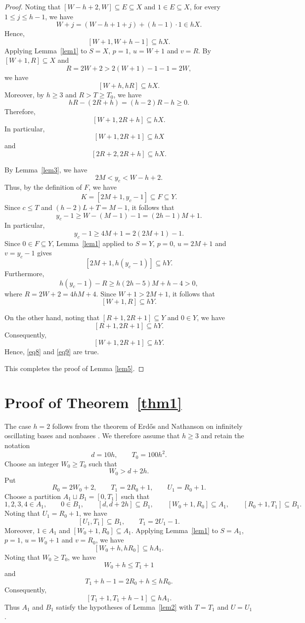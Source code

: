 \documentclass[reqno,12pt,twoside]{article}
\numberwithin{equation}{section}
\begin{document}
\begin{proof}
Noting that $[W-h+2,W]\subseteq E\subseteq X$ and $1\in E\subseteq X$,
for every $1\le j\le h-1$, we have
\[
 W+j=(W-h+1+j)+(h-1)\cdot1\in hX.
\]
Hence,
\[
 [W+1,W+h-1]\subseteq hX.
\]
Applying Lemma~\ref{lem1} to $S=X$, $p=1$,
$u=W+1$ and $v=R$. By $[W+1,R]\subseteq X$ and \[
 R=2W+2>2(W+1)-1-1=2W,
\]
we have
\[
 [W+h,hR]\subseteq hX.
\]
Moreover, by $h\ge3$ and $R>T\ge T_0$, we have
\[
 hR-(2R+h)=(h-2)R-h\ge0.
\]
 Therefore,
\[
 [W+1,2R+h]\subseteq hX.
\]
In particular,
\[
 [W+1,2R+1]\subseteq hX
\]
and
\[
 [2R+2,2R+h]\subseteq hX.
\]

By Lemma~\ref{lem3}, we have
\[
 2M<y_c<W-h+2.
\]
Thus, by the definition of $F$, we have
\[
 K=[2M+1,y_c-1]\subseteq F\subseteq Y.
\]
Since $c\le T$ and $(h-2)L+T=M-1$, it follows that
\[
 y_c-1\ge W-(M-1)-1=(2h-1)M+1.
\]
In particular,
\[
 y_c-1\ge4M+1=2(2M+1)-1.
\]
Since $0\in F\subseteq Y$, Lemma~\ref{lem1} applied to $S=Y$, $p=0$,
$u=2M+1$ and $v=y_c-1$ gives
\[
 [2M+1,h(y_c-1)]\subseteq hY.
\]
Furthermore,
\[
 h(y_c-1)-R
 \ge h(2h-5)M+h-4>0,
\]
where $R=2W+2=4hM+4$. Since $W+1>2M+1$, it follows that
\[
 [W+1,R]\subseteq hY.
\]

On the other hand, noting that $[R+1,2R+1]\subseteq Y$ and $0\in Y$, we have
\[
 [R+1,2R+1]\subseteq hY.
\]
Consequently,
\[
 [W+1,2R+1]\subseteq hY.
\]
Hence, \eqref{eq8} and \eqref{eq9} are true.

This completes the proof of Lemma \ref{lem5}.
\end{proof}
\section{Proof of Theorem~\ref{thm1}}
The case $h=2$ follows from the theorem of Erd\H{o}s and Nathanson on infinitely oscillating bases and nonbases \cite{ErdosNathanson1976}. We therefore assume that $h\ge3$ and retain the notation
\[
 d=10h,\qquad T_0=100h^2.
\]
Choose an integer $W_0\ge T_0$ such that
\[
 W_0>d+2h.
\]
Put
\[
 R_0=2W_0+2,\qquad T_1=2R_0+1,\qquad U_1=R_0+1.
\]
Choose a partition $A_1\sqcup B_1=[0,T_1]$ such that
\[
 1,2,3,4\in A_1,\qquad 0\in B_1,\qquad [d,d+2h]\subseteq B_1,\qquad [W_0+1,R_0]\subseteq A_1,\qquad [R_0+1,T_1]\subseteq B_1.
\]
Noting that $U_1=R_0+1$, we have
\[
 [U_1,T_1]\subseteq B_1,\qquad T_1=2U_1-1.
\]
Moreover, $1\in A_1$ and $[W_0+1,R_0]\subseteq A_1$. Applying Lemma~\ref{lem1} to $S=A_1$, $p=1$, $u=W_0+1$ and $v=R_0$, we have
\[
 [W_0+h,hR_0]\subseteq hA_1.
\]
Noting that $W_0\ge T_0$, we have
\[
 W_0+h\le T_1+1
\]
and
\[
 T_1+h-1=2R_0+h\le hR_0.
\]
Consequently,
\[
 [T_1+1,T_1+h-1]\subseteq hA_1.
\]
Thus $A_1$ and $B_1$ satisfy the hypotheses of Lemma~\ref{lem2} with $T=T_1$ and $U=U_1$.
\end{document}
